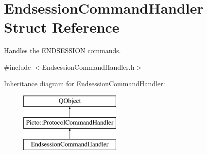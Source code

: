 \hypertarget{struct_endsession_command_handler}{\section{Endsession\-Command\-Handler Struct Reference}
\label{struct_endsession_command_handler}
}


Handles the E\-N\-D\-S\-E\-S\-S\-I\-O\-N commands.  




{\ttfamily \#include $<$Endsession\-Command\-Handler.\-h$>$}

Inheritance diagram for Endsession\-Command\-Handler\-:\begin{figure}[H]
\begin{center}
\leavevmode
\includegraphics[height=3.000000cm]{struct_endsession_command_handler}
\end{center}
\end{figure}
